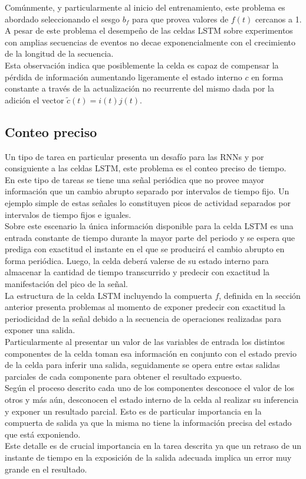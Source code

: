 \documentclass{article}
\begin{document}
	Comúnmente, y particularmente al inicio del entrenamiento, este problema es abordado seleccionando el sesgo $b_f$ para que provea valores de $f(t)$ cercanos a 1. A pesar de este problema el desempeño de las celdas LSTM sobre experimentos con amplias secuencias de eventos no decae exponencialmente con el crecimiento de la longitud de la secuencia.\\
	Esta observación indica que posiblemente la celda es capaz de compensar la pérdida de información aumentando ligeramente el estado interno $c$ en forma constante a través de la actualización no recurrente del mismo dada por la adición el vector $\tilde{c}(t) = i(t)j(t)$.
	
	\subsection{Conteo preciso}
	Un tipo de tarea en particular presenta un desafío para las RNNs y por consiguiente a las celdas LSTM, este problema es el conteo preciso de tiempo.\\
	En este tipo de tareas se tiene una señal periódica que no provee mayor información que un cambio abrupto separado por intervalos de tiempo fijo. Un ejemplo simple de estas señales lo constituyen picos de actividad separados por intervalos de tiempo fijos e iguales.\\
	Sobre este escenario la única información disponible para la celda LSTM es una entrada constante de tiempo durante la mayor parte del periodo y se espera que prediga con exactitud el instante en el que se producirá el cambio abrupto en forma periódica. Luego, la celda deberá valerse de su estado interno para almacenar la cantidad de tiempo transcurrido y predecir con exactitud la manifestación del pico de la señal.\\
	
	La estructura de la celda LSTM incluyendo la compuerta $f$, definida en la sección anterior presenta problemas al momento de exponer predecir con exactitud la periodicidad de la señal debido a la secuencia de operaciones realizadas para exponer una salida.\\
	Particularmente al presentar un valor de las variables de entrada los distintos componentes de la celda toman esa información en conjunto con el estado previo de la celda para inferir una salida, seguidamente se opera entre estas salidas parciales de cada componente para obtener el resultado expuesto.\\
	Según el proceso descrito cada uno de los componentes desconoce el valor de los otros y más aún, desconocen el estado interno de la celda al realizar su inferencia y exponer un resultado parcial. Esto es de particular importancia en la compuerta de salida ya que la misma no tiene la información precisa del estado que está exponiendo.\\
	Este detalle es de crucial importancia en la tarea descrita ya que un retraso de un instante de tiempo en la exposición de la salida adecuada implica un error muy grande en el resultado.\\
	
\end{document}
